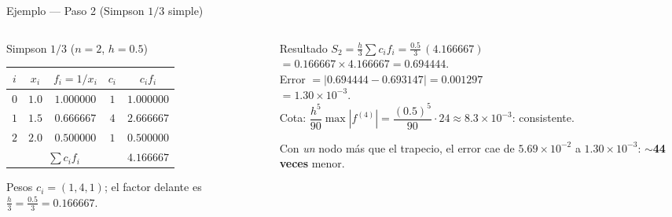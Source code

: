 \documentclass[aspectratio=169,10pt]{beamer}
\begin{document}
\begin{frame}{Ejemplo — Paso 2 (Simpson $1/3$ simple)}
\begin{columns}[T]
\begin{column}{0.50\textwidth}
\begin{cardgear}{Simpson $1/3$ ($n{=}2$, $h{=}0.5$)}{\faTable}
\centering
{\footnotesize\renewcommand{\arraystretch}{1.35}\setlength{\tabcolsep}{7pt}
\begin{tabular}{c|c|c|c|c}
$i$ & $x_i$ & $f_i=1/x_i$ & $c_i$ & $c_i f_i$\\\hline
$0$ & $1.0$ & $1.000000$ & $1$ & $1.000000$\\
$1$ & $1.5$ & $0.666667$ & $4$ & $2.666667$\\
$2$ & $2.0$ & $0.500000$ & $1$ & $0.500000$\\\hline
\multicolumn{4}{c|}{$\sum c_i f_i$} & $4.166667$\\
\end{tabular}}
\end{cardgear}
\vspace{1mm}
\begin{cardnota}[\faInfoCircle]
{\footnotesize Pesos $c_i=(1,4,1)$; el factor delante es $\tfrac{h}{3}=\tfrac{0.5}{3}=0.166667$.}
\end{cardnota}
\end{column}
\begin{column}{0.48\textwidth}
\begin{cardidea}{Resultado}{\faCalculator}
{\footnotesize $\displaystyle S_2=\frac{h}{3}\sum c_i f_i=\frac{0.5}{3}\,(4.166667)$\\[0.5mm]
\hspace*{6mm}$=0.166667\times4.166667=\mathbf{0.694444}$.\\[0.9mm]
Error $=|0.694444-0.693147|=0.001297$\\[0.2mm]
\hspace*{9mm}$=1.30{\times}10^{-3}$.\\[0.9mm]
Cota: $\dfrac{h^5}{90}\max|f^{(4)}|=\dfrac{(0.5)^5}{90}\cdot24\approx8.3{\times}10^{-3}$: consistente.}
\end{cardidea}
\vspace{1mm}
\begin{cardnota}[\faExclamationTriangle]
{\footnotesize Con \emph{un} nodo más que el trapecio, el error cae de $5.69{\times}10^{-2}$ a $1.30{\times}10^{-3}$: $\sim$\textbf{44 veces} menor.}
\end{cardnota}
\end{column}
\end{columns}
\end{frame}
\end{document}
